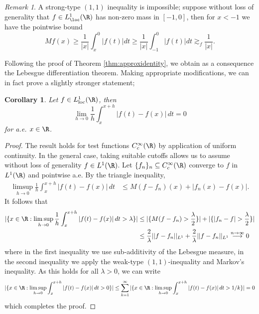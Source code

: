 \documentclass[reqno]{amsart}
\newtheorem{corollary}[theorem]{Corollary}
\theoremstyle{definition}
\theoremstyle{remark}
\newtheorem*{remark}{Remark}
\begin{document}
\begin{remark}
	A strong-type $(1, 1)$ inequality is impossible; suppose without loss of generality that $f \in L^1_{\loc} (\R)$ has non-zero mass in $[-1, 0]$, then for $x < -1$ we have the pointwise bound
		\[ M f(x) \geq \frac{1}{|x|} \int_x^0 |f(t)| dt \geq \frac{1}{|x|} \int_{-1}^0 |f(t)| dt \gtrsim_f \frac{1}{|x|}. \]
\end{remark}

Following the proof of Theorem \ref{thm:approxidentity}, we obtain as a consequence the Lebesgue differentiation theorem. Making appropriate modifications, we can in fact prove a slightly stronger statement;

\begin{corollary}
	Let $f \in L^1_{\text{loc}} (\R)$, then 
		\[ \lim_{h \to 0} \frac1h \int_x^{x + h} |f(t) - f(x)| \, dt = 0  \]
	for a.e. $x \in \R$. 	
\end{corollary}

\begin{proof}
	The result holds for test functions $C^\infty_c (\R)$ by application of uniform continuity. In the general case, taking suitable cutoffs allows us to assume without loss of generality $f \in L^1 (\R)$. Let $\{ f_n \}_n \subseteq C^\infty_c (\R)$ converge to $f$ in $L^1 (\R)$ and pointwise a.e. By the triangle inequality, 
		\begin{align*}
			 \limsup_{h \to 0}\frac1h \int_x^{x + h} |f(t) - f(x)| \, dt 
			 	&\leq M(f - f_n)(x) + |f_n (x) - f(x)|.
		\end{align*}	 
	It follows that
		\begin{align*}
			 |\{ x \in \R : \limsup_{h \to 0} \frac1h \int_x^{x + h} |f(t) - f(x)| \, dt > \lambda \}| 
			 	&\leq |\{ M(f - f_n) > \frac\lambda2 \}| + |\{  |f_n  - f| > \frac\lambda2 \}|\\
			 	&\leq \frac2\lambda ||f - f_n||_{L^1} + \frac2\lambda ||f - f_n||_{L^1} \overset{n \to \infty}{\longrightarrow} 0
		\end{align*}	 
	where in the first inequality we use sub-additivity of the Lebesgue measure, in the second inequality we apply the weak-type $(1, 1)$-inequality and Markov's inequality. As this holds for all $\lambda > 0$, we can write
		\[ |\{ x \in \R : \limsup_{h \to 0} \int_x^{x + h} |f(t) - f(x)| \, dt > 0 \}| \leq \sum_{k = 1}^\infty |\{ x \in \R : \limsup_{h \to 0} \int_x^{x + h} |f(t) - f(x)| \, dt > 1/k \}| = 0 \]
	which completes the proof. 		
\end{proof}
\end{document}
